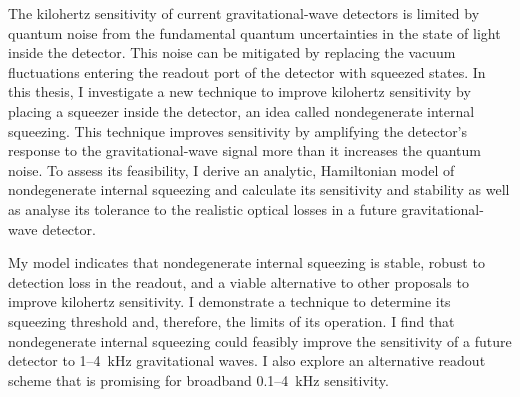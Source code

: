 The kilohertz sensitivity of current gravitational-wave detectors is limited by quantum noise from the fundamental quantum uncertainties in the state of light inside the detector. This noise can be mitigated by replacing the vacuum fluctuations entering the readout port of the detector with squeezed states.
In this thesis, I investigate a new technique to improve kilohertz sensitivity by placing a squeezer inside the detector, an idea called nondegenerate internal squeezing. This technique improves sensitivity by amplifying the detector's response to the gravitational-wave signal more than it increases the quantum noise.
To assess its feasibility, I derive an analytic, Hamiltonian model of nondegenerate internal squeezing and calculate its sensitivity and stability as well as analyse its tolerance to the realistic optical losses in a future gravitational-wave detector.


My model indicates that nondegenerate internal squeezing is stable, robust to detection loss in the readout, and a viable alternative to other proposals to improve kilohertz sensitivity. %
I demonstrate a technique to determine its squeezing threshold and, therefore, the limits of its operation. 
I find that nondegenerate internal squeezing could feasibly improve the sensitivity of a future detector to 1--4~kHz gravitational waves. I also explore an alternative readout scheme that is promising for broadband 0.1--4~kHz sensitivity.


